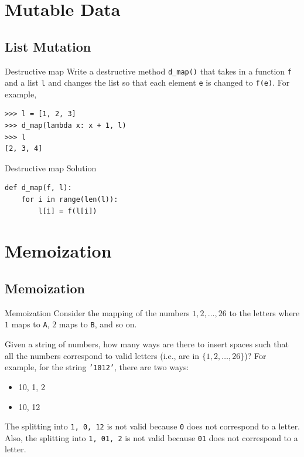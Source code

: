 \documentclass[9pt]{beamer}
\begin{document}
\section{Mutable Data}
\subsection{List Mutation}

\begin{frame}[fragile]{Destructive map}
  Write a destructive method {\tt d\_map()} that takes in a function {\tt f}
  and a list {\tt l} and changes the list so that each element {\tt e} is
  changed to {\tt f(e)}. For example,

  \begin{lstlisting}
>>> l = [1, 2, 3]
>>> d_map(lambda x: x + 1, l)
>>> l
[2, 3, 4]
  \end{lstlisting}
\end{frame}

\begin{frame}[fragile]{Destructive map}
  Solution

  \begin{lstlisting}
def d_map(f, l):
    for i in range(len(l)):
        l[i] = f(l[i])
  \end{lstlisting}

\end{frame}

\section{Memoization}
\subsection{Memoization}

\begin{frame}[fragile]{Memoization}
  Consider the mapping of the numbers $1, 2, \dots, 26$ to the letters where
  $1$ maps to {\tt A}, $2$ maps to {\tt B}, and so on.

  Given a string of numbers, how many ways are there to insert spaces such
  that all the numbers correspond to valid letters (i.e., are in $\{1, 2,
  \dots, 26\}$)? For example, for the string {\tt '1012'}, there are two
  ways:

  \begin{itemize}
    \item
      10, 1, 2
    \item
      10, 12
  \end{itemize}

  The splitting into {\tt 1, 0, 12} is not valid because {\tt 0} does not
  correspond to a letter. Also, the splitting into {\tt 1, 01, 2} is not
  valid because {\tt 01} does not correspond to a letter.
\end{frame}
\end{document}
